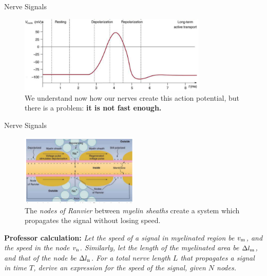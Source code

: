 \documentclass{beamer}
\begin{document}
\begin{frame}{Nerve Signals}
\begin{figure}
\centering
\includegraphics[width=0.8\textwidth]{figures/nerve3.png}
\caption{\label{fig:nerve3} We understand now how our nerves create this action potential, but there is a problem: \textbf{it is not fast enough.}}
\end{figure}
\end{frame}

\begin{frame}{Nerve Signals}
\begin{figure}
\centering
\includegraphics[width=0.5\textwidth]{figures/nerve5.png}
\caption{\label{fig:nerve4} The \textit{nodes of Ranvier} between \textit{myelin sheaths} create a system which propagates the signal without losing speed.}
\end{figure}
\small
\textbf{Professor calculation:} \textit{Let the speed of a signal in myelinated region be $v_{\rm m}$, and the speed in the node $v_{\rm n}$. Similarly, let the length of the myelinated area be $\Delta l_{\rm m}$, and that of the node be $\Delta l_{\rm n}$.  For a total nerve length $L$ that propagates a signal in time $T$, derive an expression for the speed of the signal, given $N$ nodes.}
\end{frame}
\end{document}
